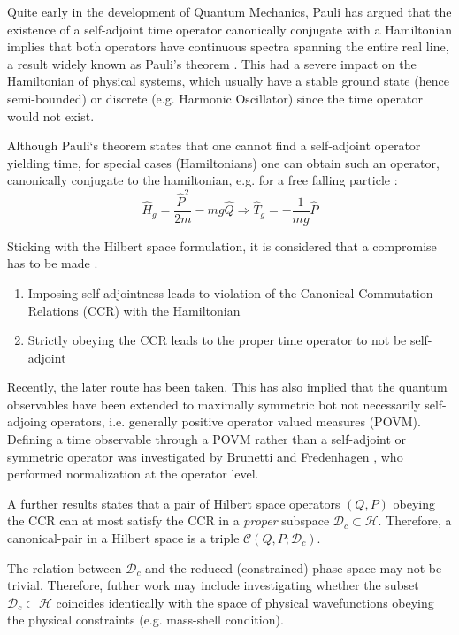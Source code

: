 \documentclass[a4paper,10pt]{article}
\numberwithin{equation}{section}
\begin{document}
Quite early in the development of Quantum Mechanics, Pauli has argued that the existence of a self-adjoint time operator canonically conjugate with a Hamiltonian implies that both operators have continuous spectra spanning the entire real line, a result widely known as Pauli’s theorem \cite{pauli1980general}. This had a severe impact on the Hamiltonian of physical systems, which usually have a stable ground state (hence semi-bounded) or discrete (e.g. Harmonic Oscillator) since the time operator would not exist. 

Although Pauli`s theorem states that one cannot find a self-adjoint operator yielding time, for special cases (Hamiltonians) one can obtain such an operator, canonically conjugate to the hamiltonian, e.g. for a free falling particle \cite{BuschTEUR}:
\begin{equation}
    \hat{H}_g = \frac{\hat{P}^2}{2m} - mg\hat{Q} \Rightarrow \hat{T}_g = -\frac{1}{mg}\hat{P}
\end{equation}

Sticking with the Hilbert space formulation, it is considered that a compromise has to be made \cite{GalaponCanonicalPairs}.
\begin{enumerate}
    \item Imposing self-adjointness leads to violation of the Canonical Commutation Relations (CCR) with the Hamiltonian
    
    \item Strictly obeying the CCR leads to the proper time operator to not be self-adjoint
\end{enumerate}

Recently, the later route has been taken. This has also implied that the quantum observables have been extended to maximally symmetric bot not necessarily self-adjoing operators, i.e. generally positive operator valued measures (POVM). Defining a time observable through a POVM rather than a self-adjoint or symmetric operator was investigated by Brunetti and Fredenhagen \cite{Fredenhagen}, who performed normalization at the operator level. 

A further results \cite{galaponcanonicaltriple} states that a pair of Hilbert space operators $(Q, P)$ obeying the CCR can at most satisfy the CCR in a \textit{proper} subspace $\mathcal{D}_c \subset \mathcal{H}$. Therefore, a canonical-pair in a Hilbert space is a triple $\mathcal{C}\left( Q,P; \mathcal{D}_c\right)$. 

The relation between $\mathcal{D}_c$ and the reduced (constrained) phase space may not be trivial. Therefore, futher work may include investigating whether the subset $\mathcal{D}_c \subset \mathcal{H}$ coincides identically with the space of physical wavefunctions obeying the physical constraints (e.g. mass-shell condition).
\end{document}
